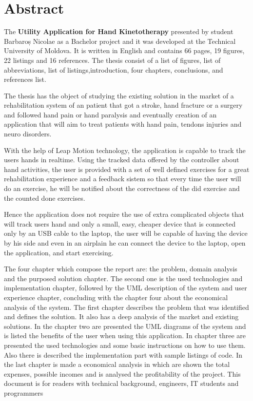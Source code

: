 \section*{Abstract}


The \textbf{Utility Application for Hand Kinetotherapy} presented by student Barbaroș Nicolae as a Bachelor project and it was developed at the Technical University of Moldova. It is written in English and contains 66 pages, 19 figures, 22 listings and 16 references. The thesis consist of a list of figures, list of abbreviations, list of listings,introduction, four chapters, conclusions, and references list.


The thesis has the object of studying the existing solution in the market of a rehabilitation system of an patient that got a stroke, hand fracture or a surgery and followed hand pain or hand paralysis and eventually creation of an application that  will aim to treat patients with hand pain, tendons injuries and neuro disorders.


With the help of Leap Motion technology, the application is capable to track the users hands in realtime. Using the tracked data offered by the controller about hand activities, the user is provided with a set of well defined exercises for a great rehabilitation experience and a feedback sistem so that every time the user will do an exercise, he will be notified about the correctness of the did exercise and the counted done exercises.

Hence the application does not require the use of extra complicated objects that will track users hand and only a small, easy, cheaper device that is connected only by an USB cable to the laptop, the user will be capable of having the device by his side and even in an airplain he can connect the device to the laptop, open the application, and start exercising.


The four chapter which compose the report are: the problem, domain analysis and the purposed
solution chapter. The second one is the used technologies and implementation chapter, followed by
the UML description of the system and user experience chapter, concluding with the chapter four
about the economical analysis of the system. The first chapter describes the problem that was identified and defines the solution. It also has a deep analysis of the market and existing solutions.
In the chapter two are presented the UML diagrams of the system and is listed the benefits of the user when using this application. In chapter three are presented the used technologies and some basic instructions on how to use
them. Also there is described the implementation part with sample listings of code. In the last
chapter is made a economical analysis in which are shown the total expenses, possible incomes and
is analysed the profitability of the project. This document is for readers with technical background,
engineers, IT students and programmers
